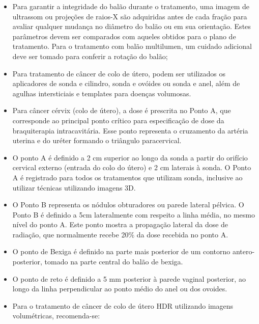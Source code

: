 \documentclass[11pt,a4paper]{article}
\newcounter{exemplo}
\begin{document}
\begin{exemplo}[8. Braquiterapia]
\begin{itemize}
        \item Para garantir a integridade do balão durante o tratamento, uma imagem de ultrassom ou projeções de raios-X são adquiridas antes de cada fração para avaliar qualquer mudança no diâmetro do balão ou em sua orientação. Estes parâmetros devem ser comparados com aqueles obtidos para o plano de tratamento. Para o tratamento com balão multilumen, um cuidado adicional deve ser tomado para conferir a rotação do balão;
        
        \item Para tratamento de câncer de colo de útero, podem ser utilizados os aplicadores de sonda e cilindro, sonda e ovóides ou sonda e anel, além de agulhas intersticiais e templates para doenças volumosas.
        
        \item Para câncer cérvix (colo de útero), a dose é prescrita no Ponto A, que corresponde ao principal ponto crítico para especificação de dose da braquiterapia intracavitária. Esse ponto representa o cruzamento da artéria uterina e do uréter formando o triângulo paracervical.
        
        \item O ponto A é definido a 2 cm superior ao longo da sonda a partir do orifício cervical externo (entrada do colo do útero) e 2 cm laterais à sonda. O Ponto A é registrado para todos os tratamentos que utilizam sonda, inclusive ao utilizar técnicas utilizando imagens 3D.
        
        \item O Ponto B representa os nódulos obturadores ou parede lateral pélvica. O Ponto B é definido a 5cm lateralmente com respeito a linha média, no mesmo nível do ponto A. Este ponto mostra a propagação lateral da dose de radiação, que normalmente recebe 20\% da dose recebida no ponto A.
        
        \item O ponto de Bexiga é definido na parte mais posterior de um contorno antero-posterior, tomado na parte central do balão de bexiga.
        
        \item O ponto de reto é definido a 5 mm posterior à parede vaginal posterior, ao longo da linha perpendicular ao ponto médio do anel ou dos ovoides. 
        
        \item Para o tratamento de câncer de colo de útero HDR utilizando imagens volumétricas, recomenda-se:
        

\end{itemize}
\end{exemplo}
\end{document}
